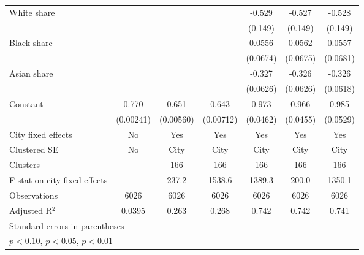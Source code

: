 {\begin{tabular}{l*{6}{c}}
\addlinespace
White share         &                     &                     &                     &      -0.529\sym{***}&      -0.527\sym{***}&      -0.528\sym{***}\\
                    &                     &                     &                     &     (0.149)         &     (0.149)         &     (0.149)         \\
\addlinespace
Black share         &                     &                     &                     &      0.0556         &      0.0562         &      0.0557         \\
                    &                     &                     &                     &    (0.0674)         &    (0.0675)         &    (0.0681)         \\
\addlinespace
Asian share         &                     &                     &                     &      -0.327\sym{***}&      -0.326\sym{***}&      -0.326\sym{***}\\
                    &                     &                     &                     &    (0.0626)         &    (0.0626)         &    (0.0618)         \\
\addlinespace
Constant            &       0.770\sym{***}&       0.651\sym{***}&       0.643\sym{***}&       0.973\sym{***}&       0.966\sym{***}&       0.985\sym{***}\\
                    &   (0.00241)         &   (0.00560)         &   (0.00712)         &    (0.0462)         &    (0.0455)         &    (0.0529)         \\
\midrule
City fixed effects  &          No         &         Yes         &         Yes         &         Yes         &         Yes         &         Yes         \\
Clustered SE        &          No         &        City         &        City         &        City         &        City         &        City         \\
Clusters            &                     &         166         &         166         &         166         &         166         &         166         \\
F-stat on city fixed effects&                     &       237.2         &      1538.6         &      1389.3         &       200.0         &      1350.1         \\
Observations        &        6026         &        6026         &        6026         &        6026         &        6026         &        6026         \\
Adjusted R$^2$      &      0.0395         &       0.263         &       0.268         &       0.742         &       0.742         &       0.741         \\
\bottomrule
\multicolumn{7}{l}{\footnotesize Standard errors in parentheses}\\
\multicolumn{7}{l}{\footnotesize \sym{*} \(p<0.10\), \sym{**} \(p<0.05\), \sym{***} \(p<0.01\)}\\
\end{tabular}
}
